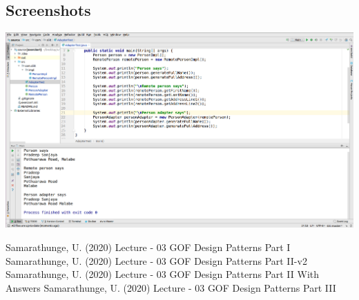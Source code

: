 \documentclass[12pt]{scrartcl} %
\begin{document}
\subsection*{Screenshots}
\begin{center}
	\includegraphics[width=1.0\columnwidth]{./figures/01.png}
	\label{Solution}%
\end{center}


\pagebreak
\newpage
\begin{thebibliography}{00}
	\raggedright
	 Samarathunge, U. (2020) Lecture - 03 GOF Design Patterns Part I
     Samarathunge, U. (2020) Lecture - 03 GOF Design Patterns Part II-v2
     Samarathunge, U. (2020) Lecture - 03 GOF Design Patterns Part II With Answers
     Samarathunge, U. (2020) Lecture - 03 GOF Design Patterns Part III
\end{thebibliography}
\end{document}
